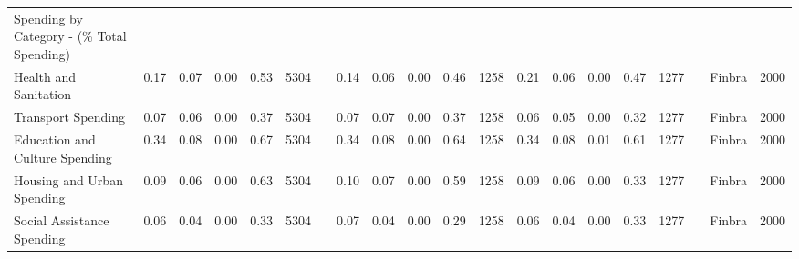 \begin{sidewaystable}
\begin{table}[H]
\begin{footnotesize}
\begin{center}
{\begin{threeparttable}[b]
\begin{tabular}{rrrrrrrrrrrrrrrrrrrr}
    \multicolumn{1}{l}{Spending by Category - (\% Total Spending)} &       &       &       &       &       &       &       &       &       &       &       &       &       &       &       &       &       &       &  \\
    \multicolumn{1}{l}{Health and Sanitation} & \multicolumn{1}{c}{0.17} & \multicolumn{1}{c}{0.07} & \multicolumn{1}{c}{0.00} & \multicolumn{1}{c}{0.53} & \multicolumn{1}{c}{5304} &       & \multicolumn{1}{c}{0.14} & \multicolumn{1}{c}{0.06} & \multicolumn{1}{c}{0.00} & \multicolumn{1}{c}{0.46} & \multicolumn{1}{c}{1258} & \multicolumn{1}{c}{0.21} & \multicolumn{1}{c}{0.06} & \multicolumn{1}{c}{0.00} & \multicolumn{1}{c}{0.47} & \multicolumn{1}{c}{1277} &       & \multicolumn{1}{c}{Finbra} & \multicolumn{1}{c}{2000} \\
    \multicolumn{1}{l}{Transport Spending} & \multicolumn{1}{c}{0.07} & \multicolumn{1}{c}{0.06} & \multicolumn{1}{c}{0.00} & \multicolumn{1}{c}{0.37} & \multicolumn{1}{c}{5304} &       & \multicolumn{1}{c}{0.07} & \multicolumn{1}{c}{0.07} & \multicolumn{1}{c}{0.00} & \multicolumn{1}{c}{0.37} & \multicolumn{1}{c}{1258} & \multicolumn{1}{c}{0.06} & \multicolumn{1}{c}{0.05} & \multicolumn{1}{c}{0.00} & \multicolumn{1}{c}{0.32} & \multicolumn{1}{c}{1277} &       & \multicolumn{1}{c}{Finbra} & \multicolumn{1}{c}{2000} \\
    \multicolumn{1}{l}{Education and Culture Spending} & \multicolumn{1}{c}{0.34} & \multicolumn{1}{c}{0.08} & \multicolumn{1}{c}{0.00} & \multicolumn{1}{c}{0.67} & \multicolumn{1}{c}{5304} &       & \multicolumn{1}{c}{0.34} & \multicolumn{1}{c}{0.08} & \multicolumn{1}{c}{0.00} & \multicolumn{1}{c}{0.64} & \multicolumn{1}{c}{1258} & \multicolumn{1}{c}{0.34} & \multicolumn{1}{c}{0.08} & \multicolumn{1}{c}{0.01} & \multicolumn{1}{c}{0.61} & \multicolumn{1}{c}{1277} &       & \multicolumn{1}{c}{Finbra} & \multicolumn{1}{c}{2000} \\
    \multicolumn{1}{l}{Housing and Urban Spending} & \multicolumn{1}{c}{0.09} & \multicolumn{1}{c}{0.06} & \multicolumn{1}{c}{0.00} & \multicolumn{1}{c}{0.63} & \multicolumn{1}{c}{5304} &       & \multicolumn{1}{c}{0.10} & \multicolumn{1}{c}{0.07} & \multicolumn{1}{c}{0.00} & \multicolumn{1}{c}{0.59} & \multicolumn{1}{c}{1258} & \multicolumn{1}{c}{0.09} & \multicolumn{1}{c}{0.06} & \multicolumn{1}{c}{0.00} & \multicolumn{1}{c}{0.33} & \multicolumn{1}{c}{1277} &       & \multicolumn{1}{c}{Finbra} & \multicolumn{1}{c}{2000} \\
    \multicolumn{1}{l}{Social Assistance Spending} & \multicolumn{1}{c}{0.06} & \multicolumn{1}{c}{0.04} & \multicolumn{1}{c}{0.00} & \multicolumn{1}{c}{0.33} & \multicolumn{1}{c}{5304} &       & \multicolumn{1}{c}{0.07} & \multicolumn{1}{c}{0.04} & \multicolumn{1}{c}{0.00} & \multicolumn{1}{c}{0.29} & \multicolumn{1}{c}{1258} & \multicolumn{1}{c}{0.06} & \multicolumn{1}{c}{0.04} & \multicolumn{1}{c}{0.00} & \multicolumn{1}{c}{0.33} & \multicolumn{1}{c}{1277} &       & \multicolumn{1}{c}{Finbra} & \multicolumn{1}{c}{2000} \\

\end{tabular}
\end{threeparttable}}
\end{center}
\end{footnotesize}
\end{table}
\end{sidewaystable}
